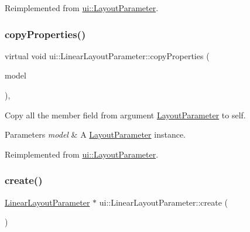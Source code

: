 Reimplemented from \hyperlink{classui_1_1LayoutParameter_af4c1b163c31ac6244902610334ead73f}{ui\+::\+Layout\+Parameter}.

\mbox{\label{classui_1_1LinearLayoutParameter_aadf884af74f03c8e31bd832082dfff6f}} 
\subsubsection{\texorpdfstring{copy\+Properties()}{copyProperties()}\hspace{0.1cm}{\footnotesize\ttfamily [2/2]}}
{\footnotesize\ttfamily virtual void ui\+::\+Linear\+Layout\+Parameter\+::copy\+Properties (\begin{DoxyParamCaption}\item[{\hyperlink{classui_1_1LayoutParameter}{Layout\+Parameter} $\ast$}]{model }\end{DoxyParamCaption})\hspace{0.3cm}{\ttfamily [override]}, {\ttfamily [virtual]}}

Copy all the member field from argument \hyperlink{classui_1_1LayoutParameter}{Layout\+Parameter} to self. 
\begin{DoxyParams}{Parameters}
{\em model} & A \hyperlink{classui_1_1LayoutParameter}{Layout\+Parameter} instance. \\
\hline
\end{DoxyParams}


Reimplemented from \hyperlink{classui_1_1LayoutParameter_af4c1b163c31ac6244902610334ead73f}{ui\+::\+Layout\+Parameter}.

\mbox{\label{classui_1_1LinearLayoutParameter_a000ee9879689523f524bc5564109bf81}} 
\subsubsection{\texorpdfstring{create()}{create()}\hspace{0.1cm}{\footnotesize\ttfamily [1/2]}}
{\footnotesize\ttfamily \hyperlink{classui_1_1LinearLayoutParameter}{Linear\+Layout\+Parameter} $\ast$ ui\+::\+Linear\+Layout\+Parameter\+::create (\begin{DoxyParamCaption}\item[{void}]{ }\end{DoxyParamCaption})\hspace{0.3cm}{\ttfamily [static]}}

